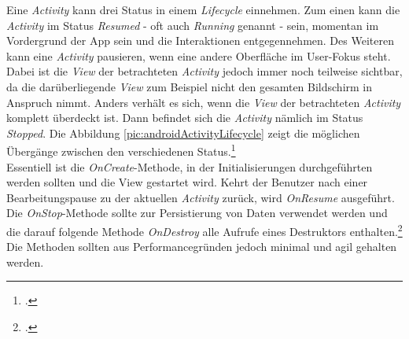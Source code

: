 Eine \textit{Activity} kann drei Status in einem \textit{Lifecycle} einnehmen. Zum einen kann die \textit{Activity} im Status \textit{Resumed} - oft auch \textit{Running} genannt - sein, momentan im Vordergrund der App sein und die Interaktionen entgegennehmen. Des Weiteren kann eine \textit{Activity} pausieren, wenn eine andere Oberfläche im User-Fokus steht. Dabei ist die \textit{View} der betrachteten \textit{Activity} jedoch immer noch teilweise sichtbar, da die darüberliegende \textit{View} zum Beispiel nicht den gesamten Bildschirm in Anspruch nimmt. Anders verhält es sich, wenn die \textit{View} der betrachteten \textit{Activity} komplett überdeckt ist. Dann befindet sich die \textit{Activity} nämlich im Status \textit{Stopped}. Die Abbildung \ref{pic:androidActivityLifecycle} zeigt die möglichen Übergänge zwischen den verschiedenen Status.\footcite{Android-Activities}\\
Essentiell ist die \textit{OnCreate}-Methode, in der Initialisierungen durchgeführten werden sollten und die View gestartet wird. Kehrt der Benutzer nach einer Bearbeitungspause zu der aktuellen \textit{Activity} zurück, wird \textit{OnResume} ausgeführt.\\
Die \textit{OnStop}-Methode sollte zur Persistierung von Daten verwendet werden und die darauf folgende Methode \textit{OnDestroy} alle Aufrufe eines Destruktors enthalten.\footcite[S. 289]{Android-BeckerPant}\\
Die Methoden sollten aus Performancegründen jedoch minimal und agil gehalten werden.
